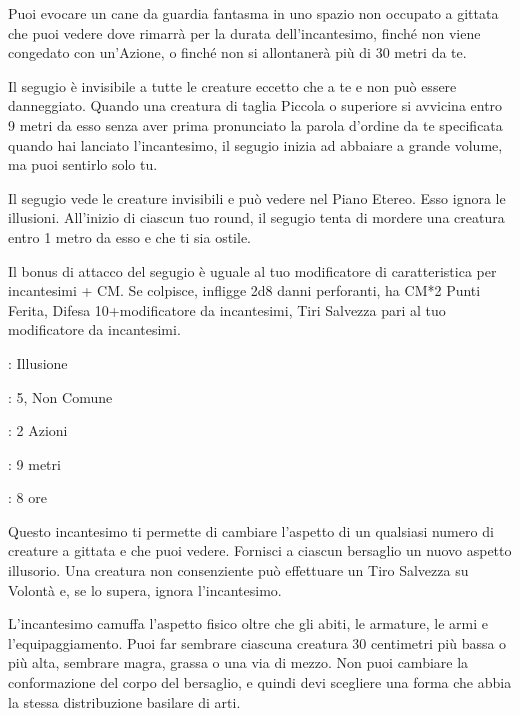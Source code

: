 \begin{multicols}{2}
Puoi evocare un cane da guardia fantasma in uno spazio non occupato a gittata che puoi vedere dove rimarrà per la durata dell'incantesimo, finché non viene congedato con un'Azione, o finché non si allontanerà più di 30 metri da te.

Il segugio è invisibile a tutte le creature eccetto che a te e non può essere danneggiato. Quando una creatura di taglia Piccola o superiore si avvicina entro 9 metri da esso senza aver prima pronunciato la parola d'ordine da te specificata quando hai lanciato l'incantesimo, il segugio inizia ad abbaiare a grande volume, ma puoi sentirlo solo tu.

Il segugio vede le creature invisibili e può vedere nel Piano Etereo. Esso ignora le illusioni. All'inizio di ciascun tuo round, il segugio tenta di mordere una creatura entro 1 metro da esso e che ti sia ostile.

Il bonus di attacco del segugio è uguale al tuo modificatore di caratteristica per incantesimi + CM. Se colpisce, infligge 2d8 danni perforanti, ha CM*2 Punti Ferita, Difesa 10+modificatore da incantesimi, Tiri Salvezza pari al tuo modificatore da incantesimi.

\noindent\colorbox{OBSSgold!10}{
\begin{minipage}{0.95\linewidth}
\begin{description}[noitemsep, topsep=0pt, parsep=0pt, partopsep=0pt, leftmargin=0cm, labelwidth=1.3cm]
	\item[\textbf{Lista}]: Illusione
	\item[\textbf{Livello}]: 5, Non Comune
	\item[\textbf{Lancio}]: 2 Azioni
	\item[\textbf{Gittata}]: 9 metri
	\item[\textbf{Durata}]: 8 ore
\end{description}
\end{minipage}}\smallskip

Questo incantesimo ti permette di cambiare l'aspetto di un qualsiasi numero di creature a gittata e che puoi vedere. Fornisci a ciascun bersaglio un nuovo aspetto illusorio. Una creatura non consenziente può effettuare un Tiro Salvezza su Volontà e, se lo supera, ignora l'incantesimo.

L'incantesimo camuffa l'aspetto fisico oltre che gli abiti, le armature, le armi e l'equipaggiamento. Puoi far sembrare ciascuna creatura 30 centimetri più bassa o più alta, sembrare magra, grassa o una via di mezzo. Non puoi cambiare la conformazione del corpo del bersaglio, e quindi devi scegliere una forma che abbia la stessa distribuzione basilare di arti.


\end{multicols}
